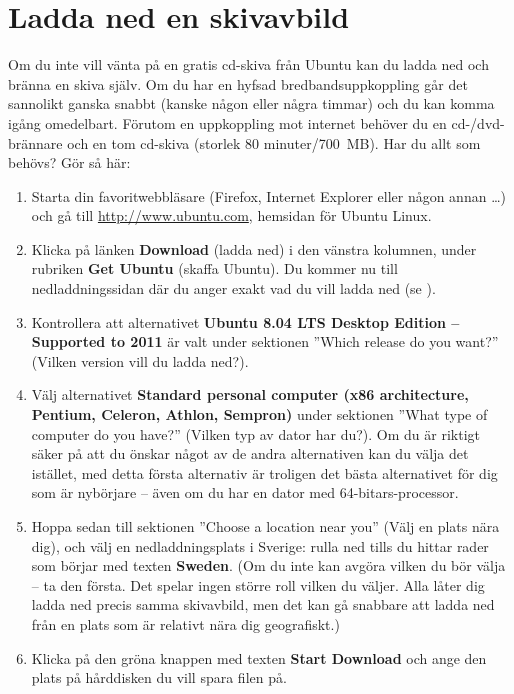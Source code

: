 \documentclass[a4paper,final]{memoir} %
\newcommand\xinstalloption{Ubuntu 8.04 LTS Desktop Edition -- Supported to 2011}
\begin{document}
\section{Ladda ned en skivavbild}

Om du inte vill vänta på en gratis cd-skiva från Ubuntu kan du ladda ned och bränna en skiva själv. Om du har en hyfsad bredbandsuppkoppling går det sannolikt ganska snabbt (kanske någon eller några timmar) och du kan komma igång omedelbart. Förutom en uppkoppling mot internet behöver du en cd-/dvd-brännare och en tom cd-skiva (storlek 80 minuter/700~MB). Har du allt som behövs? Gör så här:

\begin{enumerate}
\item Starta din favoritwebbläsare (Firefox, Internet Explorer eller någon annan \ldots{}) och gå till \url{http://www.ubuntu.com}, hemsidan för Ubuntu Linux.
\item Klicka på länken \textbf{Download} (ladda ned) i den vänstra kolumnen, under rubriken \textbf{Get Ubuntu} (skaffa Ubuntu). Du kommer nu till nedladdningssidan där du anger exakt vad du vill ladda ned (se ).
\item Kontrollera att alternativet \textbf{\xinstalloption{}} är valt under sektionen ''Which release do you want?'' (Vilken version vill du ladda ned?).
\item Välj alternativet \textbf{Standard personal computer (x86 architecture, Pentium, Celeron, Athlon, Sempron)} under sektionen ''What type of computer do you have?'' (Vilken typ av dator har du?). Om du är riktigt säker på att du önskar något av de andra alternativen kan du välja det istället, med detta första alternativ är troligen det bästa alternativet för dig som är nybörjare -- även om du har en dator med 64-bitars-processor.
\item Hoppa sedan till sektionen ''Choose a location near you'' (Välj en plats nära dig), och välj en nedladdningsplats i Sverige: rulla ned tills du hittar rader som börjar med texten \textbf{Sweden}. (Om du inte kan avgöra vilken du bör välja -- ta den första. Det spelar ingen större roll vilken du väljer. Alla låter dig ladda ned precis samma skivavbild, men det kan gå snabbare att ladda ned från en plats som är relativt nära dig geografiskt.) 
\item Klicka på den gröna knappen med texten \textbf{Start Download} och ange den plats på hårddisken du vill spara filen på.
\end{enumerate}
\end{document}

